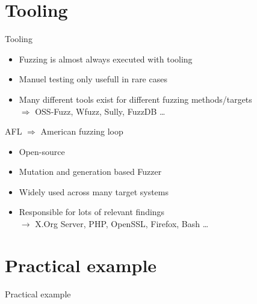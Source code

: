 \documentclass{beamer}
\begin{document}
\section{Tooling}
\begin{frame}{Tooling}
 \begin{itemize}
  \item Fuzzing is almost always executed with tooling
  \item Manuel testing only usefull in rare cases
  \item Many different tools exist for different fuzzing methods/targets\\
  $\Rightarrow$ OSS-Fuzz, Wfuzz, Sully, FuzzDB \dots
 \end{itemize}

\end{frame}
\begin{frame}{AFL}
 $\Rightarrow$ American fuzzing loop
 \begin{itemize}
 \item Open-source
  \item Mutation and generation based Fuzzer
  \item Widely used across many target systems
  \item Responsible for lots of relevant findings\\
  $\rightarrow$ X.Org Server, PHP, OpenSSL, Firefox, Bash \dots
 \end{itemize}

\end{frame}

\section{Practical example}

\begin{frame}{Practical example}
 
\end{frame}
\end{document}
